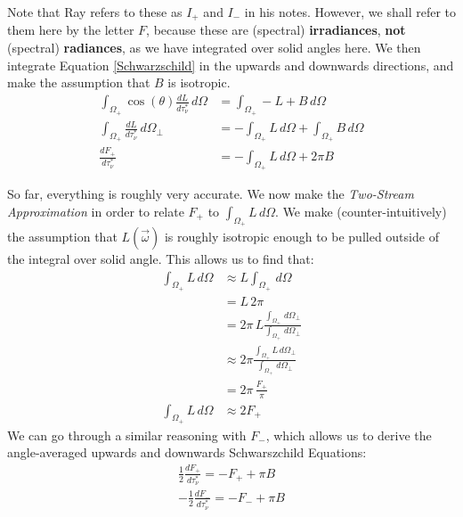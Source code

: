 Note that Ray refers to these as $I_+$ and $I_-$ in his notes. However, we shall refer to them here by the letter $F$, because these are (spectral) \textbf{irradiances}, \textbf{not} (spectral) \textbf{radiances}, as we have integrated over solid angles here. We then integrate Equation \ref{Schwarzschild} in the upwards and downwards directions, and make the assumption that $B$ is isotropic.
\begin{align*}
    \int_{\Omega_+}\cos(\theta)\frac{dL}{d\tau_\nu^*}\,d\Omega&=\int_{\Omega_+}-L+B\,d\Omega\\
    \int_{\Omega_+}\frac{dL}{d\tau_\nu^*}\,d\Omega_\perp&=-\int_{\Omega_+}L\,d\Omega+\int_{\Omega_+}B\,d\Omega\\
    \frac{dF_+}{d\tau_\nu^*}&=-\int_{\Omega_+}L\,d\Omega+2\pi B
\end{align*}

So far, everything is roughly very accurate. We now make the \textit{Two-Stream Approximation} in order to relate $F_+$ to $\int_{\Omega_+}L\,d\Omega$. We make (counter-intuitively) the assumption that $L(\vec{\omega})$ is roughly isotropic enough to be pulled outside of the integral over solid angle. This allows us to find that:
\begin{align*}
    \int_{\Omega_+}L\,d\Omega&\approx L\int_{\Omega_+}\,d\Omega \\
    & = L\,2\pi \\
    & = 2\pi \,L \frac{\int_{\Omega_+}\,d\Omega_\perp}{\int_{\Omega_+}\,d\Omega_\perp} \\
    & \approx 2\pi \frac{\int_{\Omega_+}L\,d\Omega_\perp}{\int_{\Omega_+}\,d\Omega_\perp} \\
    & = 2\pi \, \frac{F_+}{\pi}\\\int_{\Omega_+}L\,d\Omega & \approx 2F_+
\end{align*}
We can go through a similar reasoning with $F_-$, which allows us to derive the angle-averaged upwards and downwards Schwarszchild Equations:
\begin{align}
    \label{Upwards Schwarszchild Initial}
    {\frac{1}{2}\frac{dF_+}{d\tau_\nu^*}=-F_++\pi B}\\
    \label{Downwards Schwarszchild Initial}
    {-\frac{1}{2}\frac{dF_-}{d\tau_\nu^*}=-F_-+\pi B}
\end{align}

